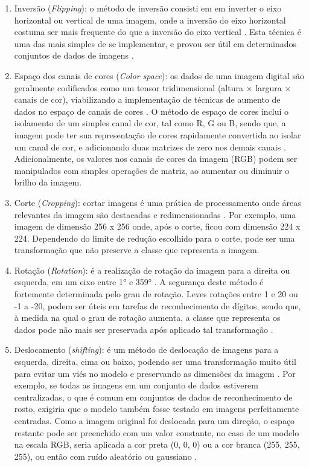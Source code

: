 \documentclass[
	12pt,				%
	oneside,			%
	a4paper,			%
	english,			%
	brazil				%
	]{abntex2ppgsi}
\begin{document}
\begin{enumerate}
  \item Inversão (\textit{Flipping}): o método de inversão consisti em em inverter o eixo horizontal ou vertical de uma imagem, onde a inversão do eixo horizontal costuma ser mais frequente do que a inversão do eixo vertical \cite{shorten2019survey}. Esta técnica é uma das mais simples de se implementar, e provou ser útil em determinados conjuntos de dados de imagens \cite{shorten2019survey}.
  
  \item Espaço dos canais de cores (\textit{Color space}): os dados de uma imagem digital são geralmente codificados como um tensor tridimensional (altura × largura × canais de cor), viabilizando a implementação de técnicas de aumento de dados no espaço de canais de cores \cite{shorten2019survey}. O método de espaço de cores inclui o isolamento de um simples canal de cor, tal como R, G ou B, sendo que, a imagem pode ter sua representação de cores rapidamente convertida ao isolar um canal de cor, e adicionando duas matrizes de zero nos demais canais \cite{shorten2019survey}. Adicionalmente, os valores nos canais de cores da imagem (RGB) podem ser manipulados com simples operações de matriz, ao aumentar ou diminuir o brilho da imagem.
  
  \item Corte (\textit{Cropping}): cortar imagens é uma prática de processamento onde áreas relevantes da imagem são destacadas e redimensionadas \cite{shorten2019survey}. Por exemplo, uma imagem de dimensão 256 x 256 onde, após o corte, ficou com dimensão 224 x 224. Dependendo do limite de redução escolhido para o corte, pode ser uma transformação que não preserve a classe que representa a imagem.
  
  \item Rotação (\textit{Rotation}): é a realização de rotação da imagem para a direita ou esquerda, em um eixo entre 1° e 359° \cite{shorten2019survey}. A segurança deste método é fortemente determinada pelo grau de rotação. Leves rotações entre 1 e 20 ou -1 a -20, podem ser úteis em tarefas de reconhecimento de dígitos, sendo que, à medida na qual o grau de rotação aumenta, a classe que representa os dados pode não mais ser preservada após aplicado tal transformação \cite{shorten2019survey}.
  
  \item Deslocamento (\textit{shifting}): é um método de deslocação de imagens para a esquerda, direita, cima ou baixo, podendo ser uma transformação muito útil para evitar um viés no modelo e preservando as dimensões da imagem \cite{shorten2019survey}. Por exemplo, se todas as imagens em um conjunto de dados estiverem centralizadas, o que é comum em conjuntos de dados de reconhecimento de rosto, exigiria que o modelo também fosse testado em imagens perfeitamente centradas. Como a imagem original foi deslocada para um direção, o espaço restante pode ser preenchido com um valor constante, no caso de um modelo na escala RGB, seria aplicada a cor preta (0, 0, 0) ou a cor branca (255, 255, 255), ou então com ruído aleatório ou gaussiano \cite{shorten2019survey}.
  

\end{enumerate}
\end{document}
